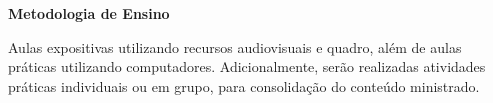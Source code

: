\begin{snugshade}\begin{center}\textbf{
    Metodologia de Ensino
}\end{center}\end{snugshade}

\noindent
Aulas expositivas utilizando recursos audiovisuais e quadro, além de aulas práticas utilizando computadores. Adicionalmente, serão realizadas atividades práticas individuais ou em grupo, para consolidação do conteúdo ministrado.
